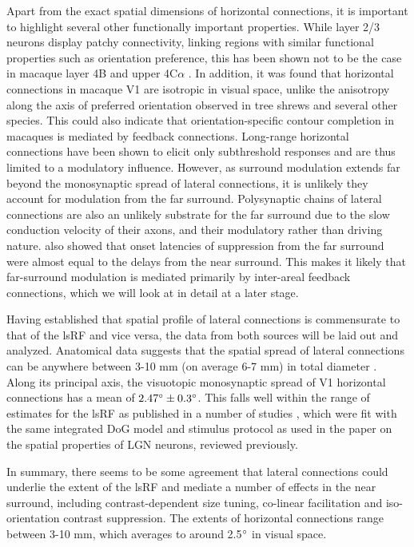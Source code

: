 Apart from the exact spatial dimensions of horizontal connections, it
is important to highlight several other functionally important
properties. While layer 2/3 neurons display patchy connectivity,
linking regions with similar functional properties such as orientation
preference, this has been shown not to be the case in macaque layer 4B
and upper 4C$\alpha$ \citep{Angelucci2002}. In addition, it was found
that horizontal connections in macaque V1 are isotropic in visual
space, unlike the anisotropy along the axis of preferred orientation
observed in tree shrews \citep{Bosking1997} and several other
species. This could also indicate that orientation-specific contour
completion in macaques is mediated by feedback connections. Long-range
horizontal connections have been shown to elicit only subthreshold
responses \citep{Hirsch1991} and are thus limited to a modulatory
influence. However, as surround modulation extends far beyond the
monosynaptic spread of lateral connections, it is unlikely they
account for modulation from the far surround. Polysynaptic chains of
lateral connections are also an unlikely substrate for the far
surround due to the slow conduction velocity of their axons, and their
modulatory rather than driving nature. \cite{Bair2003} also showed
that onset latencies of suppression from the far surround were almost
equal to the delays from the near surround. This makes it likely that
far-surround modulation is mediated primarily by inter-areal feedback
connections, which we will look at in detail at a later stage.

Having established that spatial profile of lateral connections is
commensurate to that of the lsRF and vice versa, the data from both
sources will be laid out and analyzed. Anatomical data suggests that
the spatial spread of lateral connections can be anywhere between 3-10
mm (on average 6-7 mm) in total diameter \citep{Angelucci2002}. Along
its principal axis, the visuotopic monosynaptic spread of V1
horizontal connections has a mean of $2.47\degree \pm
0.3\degree$. This falls well within the range of estimates for the
lsRF as published in a number of studies
\citep{Shushruth2009,Sceniak1999,Sceniak2001}, which were fit with the
same integrated DoG model and stimulus protocol as used in the
\cite{Sceniak2006} paper on the spatial properties of LGN neurons,
reviewed previously.

In summary, there seems to be some agreement that lateral connections
could underlie the extent of the lsRF and mediate a number of effects
in the near surround, including contrast-dependent size tuning,
co-linear facilitation and iso-orientation contrast suppression.  The
extents of horizontal connections range between 3-10 mm, which
averages to around 2.5$\degree$ in visual space.

